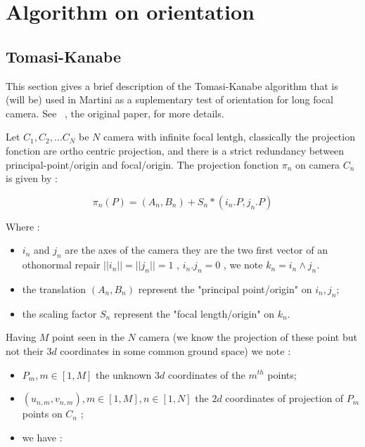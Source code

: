 \chapter{Algorithm on orientation}


\section{Tomasi-Kanabe}

This section gives a brief description of the Tomasi-Kanabe algorithm
that is (will be) used in Martini as a suplementary test of
orientation for long focal camera. See~\cite{tomasi1992shape} , the original paper,
for more details.


Let $C_1,C_2, \dots C_N$ be $N$ camera with infinite focal lentgh, classically
the projection fonction are ortho centric projection, and there is a strict redundancy between principal-point/origin and  focal/origin. The projection fonction $\pi_n$ on camera $C_n$ is given by :

\begin{equation}
   \pi_n(P) =  (A_n,B_n)   + S_n * (i_n . P , j_n.P) \label{TomKanProj}
\end{equation}

Where :

\begin{itemize}
   \item  $i_n$ and $j_n$ are the axes of the camera they are the two first vector
          of an othonormal repair $||i_n|| = ||j_n|| = 1$ , $i_n . j_n = 0 $ ,
          we note $k_n = i_n \wedge j_n$.
   \item  the translation $(A_n,B_n)$ represent the "principal point/origin" on $i_n,j_n$;
   \item  the scaling factor $S_n$ represent the "focal length/origin" on $k_n$.
\end{itemize}


Having $M$ point seen in the $N$ camera  (we know the projection of these 
point but not their $3d$ coordinates in some common ground space) we note :

\begin{itemize}
    \item $P_m , m \in[1,M]$  the unknown $3d$ coordinates of the $m^{th}$ points;
    \item $(u_{n,m},v_{n,m}), m \in[1,M], n \in [1,N] $   the $2d$ coordinates of projection
          of $P_m$ points on $C_n$ ;
    \item we have :
\end{itemize}

